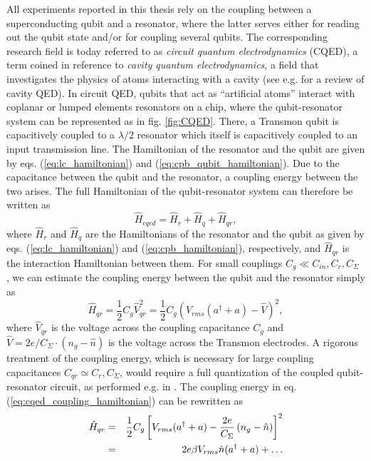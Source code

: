 All experiments reported in this thesis rely on the coupling between a superconducting qubit and a resonator, where the latter serves either for reading out the qubit state and/or for coupling several qubits. The corresponding research field is today referred to as {\it circuit quantum electrodynamics} (CQED), a term coined in reference to {\it cavity quantum electrodynamics}, a field that investigates the physics of atoms interacting with a cavity (see e.g. \citep{mabuchi_cavity_2002,walther_cavity_2006} for a review of cavity QED). In circuit QED, qubits that act as ``artificial atoms'' interact with coplanar or lumped elements resonators on a chip, where the qubit-resonator system can be represented as in fig. \ref{fig:CQED}. There, a Transmon qubit is capacitively coupled to a $\lambda/2$ resonator which itself is capacitively coupled to an input transmission line. The Hamiltonian of the resonator and the qubit are given by eqs. (\ref{eq:lc_hamiltonian}) and (\ref{eq:cpb_qubit_hamiltonian}). Due to the capacitance between the qubit and the resonator, a coupling energy between the two arises. The full Hamiltonian of the qubit-resonator system can therefore be written as
%
\begin{equation}
\hat{H}_{cqed} = \hat{H}_r+\hat{H}_q+\hat{H}_{qr},
\end{equation}
%
where $\hat{H}_{r}$ and $\hat{H}_q$ are the Hamiltonians of the resonator and the qubit as given by eqs. (\ref{eq:lc_hamiltonian}) and (\ref{eq:cpb_hamiltonian}), respectively, and $\hat{H}_{qr}$ is the interaction Hamiltonian between them. For small couplings $C_g \ll C_{in},C_r,C_\Sigma$ , we can estimate the coupling energy between the qubit and the resonator simply as
%
\begin{equation}
\hat{H}_{qr} = \frac{1}{2}C_{g}\hat{V}_{qr}^2 = \frac{1}{2}C_g\left(V_{rms}(a^\dagger+a)-\hat{V}\right)^2, \label{eq:cqed_coupling_hamiltonian}
\end{equation}
%
where $\hat{V}_{qr}$ is the voltage across the coupling capacitance $C_g$ and $\hat{V}=2e/C_\Sigma \cdot(n_g-\hat{n})$ is the voltage across the Transmon electrodes. A rigorous treatment of the coupling energy, which is necessary for large coupling capacitances $C_{qr}\simeq C_{r},C_\Sigma$, would require a full quantization of the coupled qubit-resonator circuit, as performed e.g. in \citep{nguyen_cooper_2008}. The coupling energy in eq. (\ref{eq:cqed_coupling_hamiltonian}) can be rewritten as
%
\begin{eqnarray}
\hat{H}_{qr} & = & \frac{1}{2}C_g\left[V_{rms}(a^\dagger+a)-\frac{2e}{C_\Sigma}\left(n_g-\hat{n}\right)\right]^2 \notag \\
       & = & 2e \beta V_{rms}\hat{n}(a^\dagger+a) + \hdots \label{eq:cqed_coupling}
\end{eqnarray}
